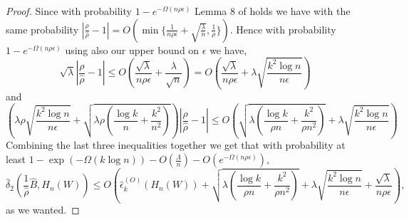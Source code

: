 \documentclass[12pt]{article}
\begin{document}
\begin{proof}
Since with probability $1-e^{-\Omega(n \rho \epsilon)} $ Lemma 8 of \cite{Borgs2015} holds we have with the same probability $| \frac{\rho}{\hat{\rho}}-1|=O( \min\{\frac{1}{n \rho \epsilon}+\sqrt{\frac{\lambda}{n }},\frac{1}{\rho}\})$. Hence with probability $1-e^{-\Omega(n \rho \epsilon)} $ using also our upper bound on $\epsilon$ we have,
$$\sqrt{\lambda}| \frac{\rho}{\hat{\rho}}-1| \leq O(\frac{\sqrt{\lambda}}{n \rho \epsilon}+\frac{\lambda}{\sqrt{n} })=O(\frac{\sqrt{\lambda}}{n \rho \epsilon}+\lambda  \sqrt{\frac{k^2\log n}{n \epsilon}})$$ and
$$(\lambda \rho \sqrt{\frac{k^2\log n}{n \epsilon}}+\sqrt{\lambda \rho \left(\frac{\log k}{n}+\frac{k^2}{n^2}\right)} ) | \frac{\rho}{\hat{\rho}}-1| \leq O(\sqrt{\lambda  \left(\frac{\log k}{\rho n}+\frac{k^2}{\rho n^2}\right)} + \lambda  \sqrt{\frac{k^2\log n}{n \epsilon}})$$ Combining the last three inequalities together we get that with probability at least $1-\exp(-\Omega( k\log n))-O(\frac{\Lambda}{n})-O(e^{-\Omega(n \rho \epsilon)}),$
\begin{equation*}
\hat{\delta}_2\left(\frac{1}{\hat{\rho}}\hat{B},H_n(W)\right) \leq O\left(\hat{\epsilon}_k^{(O)}( H_n(W))+\sqrt{\lambda  \left(\frac{\log k}{ \rho n}+\frac{k^2}{\rho n^2}\right)} + \lambda  \sqrt{\frac{k^2\log n}{n \epsilon}}+ \frac{\sqrt{\lambda}}{n \rho \epsilon}\right),
\end{equation*}as we wanted.


\end{proof}



\end{document}
